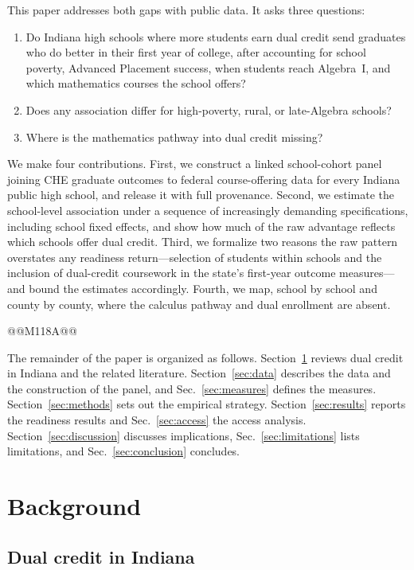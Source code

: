 \documentclass[aps,prd,reprint,superscriptaddress,nofootinbib,floatfix]{revtex4-2}
\begin{document}
This paper addresses both gaps with public data. It asks three questions:
\begin{enumerate}
\item Do Indiana high schools where more students earn dual credit send graduates who do better in their first year of college, after accounting for school poverty, Advanced Placement success, when students reach Algebra~I, and which mathematics courses the school offers?
\item Does any association differ for high-poverty, rural, or late-Algebra schools?
\item Where is the mathematics pathway into dual credit missing?
\end{enumerate}

We make four contributions. First, we construct a linked school-cohort panel joining CHE graduate outcomes to federal course-offering data for every Indiana public high school, and release it with full provenance. Second, we estimate the school-level association under a sequence of increasingly demanding specifications, including school fixed effects, and show how much of the raw advantage reflects which schools offer dual credit. Third, we formalize two reasons the raw pattern overstates any readiness return---selection of students within schools and the inclusion of dual-credit coursework in the state's first-year outcome measures---and bound the estimates accordingly. Fourth, we map, school by school and county by county, where the calculus pathway and dual enrollment are absent.

@@M118A@@

The remainder of the paper is organized as follows. Section~\ref{sec:background} reviews dual credit in Indiana and the related literature. Section~\ref{sec:data} describes the data and the construction of the panel, and Sec.~\ref{sec:measures} defines the measures. Section~\ref{sec:methods} sets out the empirical strategy. Section~\ref{sec:results} reports the readiness results and Sec.~\ref{sec:access} the access analysis. Section~\ref{sec:discussion} discusses implications, Sec.~\ref{sec:limitations} lists limitations, and Sec.~\ref{sec:conclusion} concludes.

\section{Background}\label{sec:background}

\subsection{Dual credit in Indiana}
\end{document}
